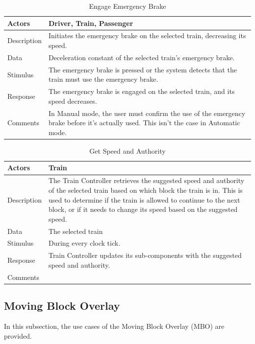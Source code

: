 \documentclass[]{article}
\begin{document}
  \begin{table}[H]
   	\centering
   	\caption{Engage Emergency Brake}
   	\begin{tabular}{|l|l|}
   		\hline
   		Actors & \parbox[t]{10cm}{Driver, Train, Passenger} \\ \hline
   		Description & \parbox[t]{10cm}{Initiates the emergency brake on the selected train, decreasing its speed.} \\ \hline
   		Data &  \parbox[t]{10cm}{Deceleration constant of the selected train's emergency brake.} \\ \hline
   		Stimulus &  \parbox[t]{10cm}{The emergency brake is pressed or the system detects that the train must use the emergency brake.} \\ \hline
   		Response & \parbox[t]{10cm}{The emergency brake is engaged on the selected train, and its speed decreases.  }\\ \hline
   		Comments & \parbox[t]{10cm}{In Manual mode, the user must confirm the use of the emergency brake before it's actually used. This isn't the case in Automatic mode. }  \\ \hline
   	\end{tabular}
   \end{table}

  \begin{table}[H]
   	\centering
   	\caption{Get Speed and Authority}
   	\begin{tabular}{|l|l|}
   		\hline
   		Actors & \parbox[t]{10cm}{Train} \\ \hline
   		Description & \parbox[t]{10cm}{The Train Controller retrieves the suggested speed and authority of the selected train based on which block the train is in. This is used to determine if the train is allowed to continue to the next block, or if it needs to change its speed based on the suggested speed.} \\ \hline
   		Data &  \parbox[t]{10cm}{The selected train } \\ \hline
   		Stimulus &  \parbox[t]{10cm}{During every clock tick.} \\ \hline
   		Response & \parbox[t]{10cm}{Train Controller updates its sub-components with the suggested speed and authority.  }\\ \hline
   		Comments & \parbox[t]{10cm}{}  \\ \hline
   	\end{tabular}
   \end{table}
   
\subsection{Moving Block Overlay}
In this subsection, the use cases of the Moving Block Overlay (MBO) are provided.
\end{document}
